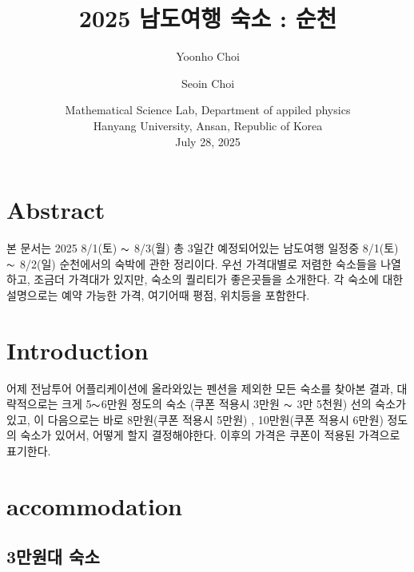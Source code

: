 \documentclass[10pt]{article}
\title{
  2025 남도여행 숙소 : 순천
}
\author{
  Yoonho Choi \and
  Seoin Choi 
}
\date{
  Mathematical Science Lab, Department of appiled physics\\
  Hanyang University, Ansan, Republic of Korea\\[1ex]
  July 28, 2025
}
\begin{document}
\maketitle

\section{Abstract}
본 문서는 2025 8/1(토) \(\thicksim\) 8/3(월) 총 3일간 예정되어있는 남도여행 일정중 8/1(토) \(\thicksim\) 8/2(일) 순천에서의 숙박에 관한 정리이다. 
우선 가격대별로 저렴한 숙소들을 나열하고, 조금더 가격대가 있지만, 숙소의 퀄리티가 좋은곳들을 소개한다. 
각 숙소에 대한 설명으로는 예약 가능한 가격, 여기어때 평점, 위치등을 포함한다. 

\section{Introduction}
어제 전남투어 어플리케이션에 올라와있는 펜션을 제외한 모든 숙소를 찾아본 결과, 대략적으로는 크게 5\(\thicksim\)6만원 정도의 숙소 (쿠폰 적용시 3만원 \(\thicksim\) 3만 5천원) 선의 숙소가 있고, 
이 다음으로는 바로 8만원(쿠폰 적용시 5만원) , 10만원(쿠폰 적용시 6만원) 정도의 숙소가 있어서, 어떻게 할지 결정해야한다. 
이후의 가격은 쿠폰이 적용된 가격으로 표기한다. 
\newpage

\section{accommodation}
\subsection{3만원대 숙소}
\end{document}
